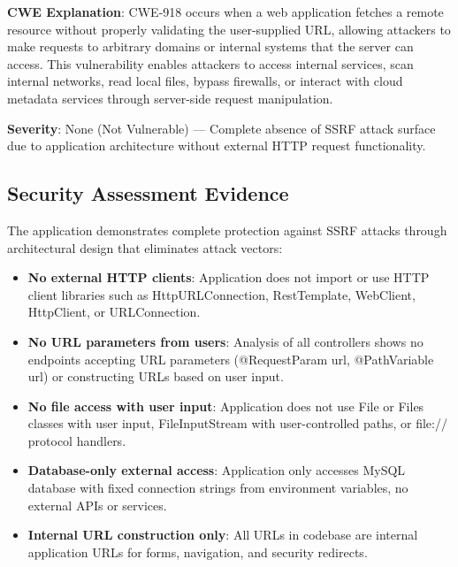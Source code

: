 \documentclass[]{UCD_CS_FYP_Report}
\begin{document}
\textbf{CWE Explanation}: CWE-918 occurs when a web application fetches a remote resource without properly validating the user-supplied URL, allowing attackers to make requests to arbitrary domains or internal systems that the server can access. This vulnerability enables attackers to access internal services, scan internal networks, read local files, bypass firewalls, or interact with cloud metadata services through server-side request manipulation.

\textbf{Severity}: None (Not Vulnerable) — Complete absence of SSRF attack surface due to application architecture without external HTTP request functionality.

\subsection{Security Assessment Evidence}
The application demonstrates complete protection against SSRF attacks through architectural design that eliminates attack vectors:
\begin{itemize}
	\item \textbf{No external HTTP clients}: Application does not import or use HTTP client libraries such as HttpURLConnection, RestTemplate, WebClient, HttpClient, or URLConnection.
	\item \textbf{No URL parameters from users}: Analysis of all controllers shows no endpoints accepting URL parameters (@RequestParam url, @PathVariable url) or constructing URLs based on user input.
	\item \textbf{No file access with user input}: Application does not use File or Files classes with user input, FileInputStream with user-controlled paths, or file:// protocol handlers.
	\item \textbf{Database-only external access}: Application only accesses MySQL database with fixed connection strings from environment variables, no external APIs or services.
	\item \textbf{Internal URL construction only}: All URLs in codebase are internal application URLs for forms, navigation, and security redirects.
\end{itemize}
\end{document}
